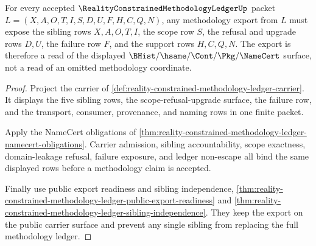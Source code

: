 \begin{theorem}
\label{thm:reality-constrained-methodology-ledger-export-accountability}
For every accepted $\RealityConstrainedMethodologyLedgerUp$ packet
$L=(X,A,O,T,I,S,D,U,F,H,C,Q,N)$, any methodology export from $L$ must expose
the sibling rows $X,A,O,T,I$, the scope row $S$, the refusal and upgrade rows
$D,U$, the failure row $F$, and the support rows $H,C,Q,N$. The export is
therefore a read of the displayed $\BHist/\hsame/\Cont/\Pkg/\NameCert$
surface, not a read of an omitted methodology coordinate.
\end{theorem}
\begin{proof}
Project the carrier of
\autoref{def:reality-constrained-methodology-ledger-carrier}. It displays the
five sibling rows, the scope-refusal-upgrade surface, the failure row, and the
transport, consumer, provenance, and naming rows in one finite packet.

Apply the NameCert obligations of
\autoref{thm:reality-constrained-methodology-ledger-namecert-obligations}.
Carrier admission, sibling accountability, scope exactness, domain-leakage
refusal, failure exposure, and ledger non-escape all bind the same displayed
rows before a methodology claim is accepted.

Finally use public export readiness and sibling independence,
\autoref{thm:reality-constrained-methodology-ledger-public-export-readiness}
and
\autoref{thm:reality-constrained-methodology-ledger-sibling-independence}.
They keep the export on the public carrier surface and prevent any single
sibling from replacing the full methodology ledger.
\end{proof}

